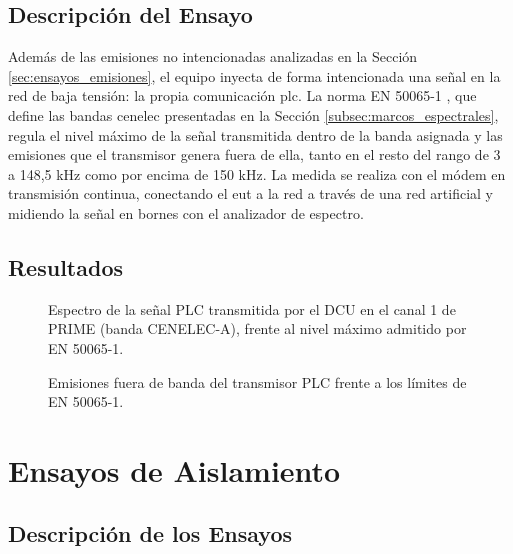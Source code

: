 \subsection{Descripción del Ensayo}
\label{subsec:descripcion_ensayo_plc}

Además de las emisiones no intencionadas analizadas en la Sección \ref{sec:ensayos_emisiones}, el equipo inyecta de forma intencionada una señal en la red de baja tensión: la propia comunicación \gls{plc}. La norma EN 50065-1 \cite{EN50065_1}, que define las bandas \gls{cenelec} presentadas en la Sección \ref{subsec:marcos_espectrales}, regula el nivel máximo de la señal transmitida dentro de la banda asignada y las emisiones que el transmisor genera fuera de ella, tanto en el resto del rango de 3 a 148,5 kHz como por encima de 150 kHz. La medida se realiza con el módem en transmisión continua, conectando el \gls{eut} a la red a través de una red artificial y midiendo la señal en bornes con el analizador de espectro.

\subsection{Resultados}
\label{subsec:resultados_plc}

\begin{figure}[htbp]
    \centering
    \caption{Espectro de la señal PLC transmitida por el DCU en el canal 1 de PRIME (banda CENELEC-A), frente al nivel máximo admitido por EN 50065-1.}
    \label{fig:espectro_tx_plc}
\end{figure}

\begin{figure}[htbp]
    \centering
    \caption{Emisiones fuera de banda del transmisor PLC frente a los límites de EN 50065-1.}
    \label{fig:emisiones_fuera_banda_plc}
\end{figure}


\section{Ensayos de Aislamiento}
\label{sec:ensayos_aislamiento}

\subsection{Descripción de los Ensayos}
\label{subsec:descripcion_aislamiento}

